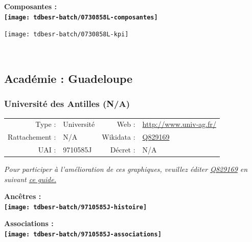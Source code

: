 \documentclass[12pt,french,]{article}
\begin{document}
\begin{center} \bf Composantes : \\  
\texttt{[image: tdbesr-batch/0730858L-composantes]} \end{center}

\begin{center}\texttt{[image: tdbesr-batch/0730858L-kpi]} \end{center}\checkoddpage

\ifoddpage \fi ~\newpage  

\hypertarget{acaduxe9mie-guadeloupe}{%
\subsection{Académie : Guadeloupe}\label{acaduxe9mie-guadeloupe}}

\hypertarget{universituxe9-des-antilles-na}{%
\subsubsection{Université des Antilles
(N/A)}\label{universituxe9-des-antilles-na}}

\begin{tabular*}{\textwidth}{rp{5cm}rl}  
\hline  
Type : & Université & Web : &\href{http://www.univ-ag.fr/}{http://www.univ-ag.fr/} \\  
Rattachement : & N/A & Wikidata : & \href{https://www.wikidata.org/entity/Q829169}{Q829169} \\  
UAI : & 9710585J & Décret : & N/A \\  
\hline  
\end{tabular*}

\textit{\scriptsize Pour participer à l'amélioration de ces graphiques, veuillez éditer  \href{https://www.wikidata.org/entity/Q829169}{Q829169}  en suivant \href{https://github.com/cpesr/wikidataESR/blob/master/Rmd/wikidataESR.md}{ce guide.}}

\vspace{1cm}  
\begin{minipage}[b]{0.50\textwidth}\begin{center} \bf Ancêtres : \\  
\texttt{[image: tdbesr-batch/9710585J-histoire]} \end{center}\end{minipage}\begin{minipage}[b]{0.50\textwidth}\begin{center} \bf Associations : \\  
\texttt{[image: tdbesr-batch/9710585J-associations]} \end{center}\end{minipage}
\end{document}
